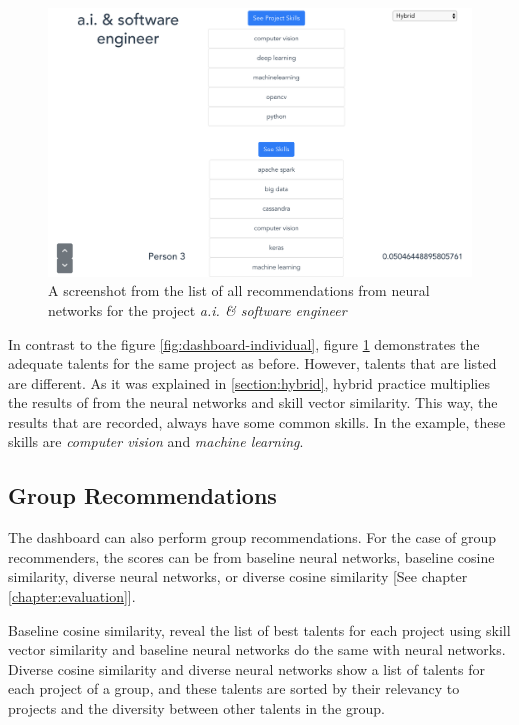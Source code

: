 \begin{figure}[htp]
	\centering
	\includegraphics[width=\textwidth]{figures/DashboardIndividualHybrid.png}
	\caption{A screenshot from the list of all recommendations from neural networks for the project \textit{a.i. \& software engineer}}
	\label{fig:dashboard-individual-hybrid}
\end{figure}

In contrast to the figure \ref{fig:dashboard-individual}, figure \ref{fig:dashboard-individual-hybrid} demonstrates the adequate talents for the same project as before. However, talents that are listed are different. As it was explained in \ref{section:hybrid}, hybrid practice multiplies the results of from the neural networks and skill vector similarity. This way, the results that are recorded, always have some common skills. In the example, these skills are \textit{computer vision} and \textit{machine learning}.

\subsection{Group Recommendations}

The dashboard can also perform group recommendations. For the case of group recommenders, the scores can be from baseline neural networks, baseline cosine similarity, diverse neural networks, or diverse cosine similarity [See chapter \ref{chapter:evaluation}].

Baseline cosine similarity, reveal the list of best talents for each project using skill vector similarity and baseline neural networks do the same with neural networks. Diverse cosine similarity and diverse neural networks show a list of talents for each project of a group, and these talents are sorted by their relevancy to projects and the diversity between other talents in the group.

